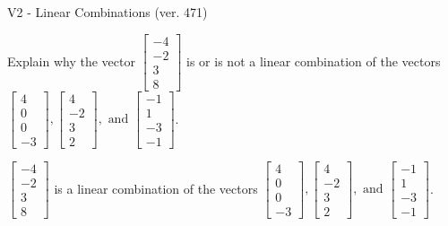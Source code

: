 \begin{exercise}
  \begin{exerciseTitle}V2 - Linear Combinations (ver. 471)\end{exerciseTitle}
  \begin{exerciseStatement}
    Explain why the vector \(\left[\begin{array}{c}
-4 \\
-2 \\
3 \\
8
\end{array}\right]\)  is or is not a linear 
	combination of the vectors \(\left[\begin{array}{c}
4 \\
0 \\
0 \\
-3
\end{array}\right] , \left[\begin{array}{c}
4 \\
-2 \\
3 \\
2
\end{array}\right] , \text{ and } \left[\begin{array}{c}
-1 \\
1 \\
-3 \\
-1
\end{array}\right]\).
	


  \end{exerciseStatement}
  \begin{exerciseAnswer}
   \(\left[\begin{array}{c}
-4 \\
-2 \\
3 \\
8
\end{array}\right]\) 
  	 is  
	a linear combination of the vectors \(\left[\begin{array}{c}
4 \\
0 \\
0 \\
-3
\end{array}\right] , \left[\begin{array}{c}
4 \\
-2 \\
3 \\
2
\end{array}\right] , \text{ and } \left[\begin{array}{c}
-1 \\
1 \\
-3 \\
-1
\end{array}\right]\).

	
  


  \end{exerciseAnswer}
\end{exercise}